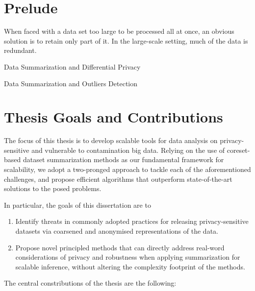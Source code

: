 \section{Prelude}
\label{sec:prelude}

When faced with a data set too large to be processed all at once, an obvious solution is to retain only part of it.  In the large-scale setting, much of the data is redundant.

\par{Data Summarization and Differential Privacy}

\par{Data Summarization and Outliers Detection}

\section{Thesis Goals and Contributions}
\label{sec:thesis-goals}

The focus of this thesis is to develop scalable tools for data analysis on privacy-sensitive and vulnerable to contamination big data. Relying on the use of coreset-based dataset summarization methods as our fundamental framework for scalability, we adopt a two-pronged approach to tackle each of the aforementioned challenges, and propose efficient algorithms that outperform state-of-the-art solutions to the posed problems. 

In particular, the goals of this dissertation are to

\begin{enumerate}
	\item Identify threats in commonly adopted practices for releasing privacy-sensitive datasets via coarsened and anonymised representations of the data.
	\item Propose novel principled methods that can directly address real-word considerations of privacy and robustness when applying summarization for scalable inference, without altering the complexity footprint of the methods.
\end{enumerate}

The central constributions of the thesis are the following:


